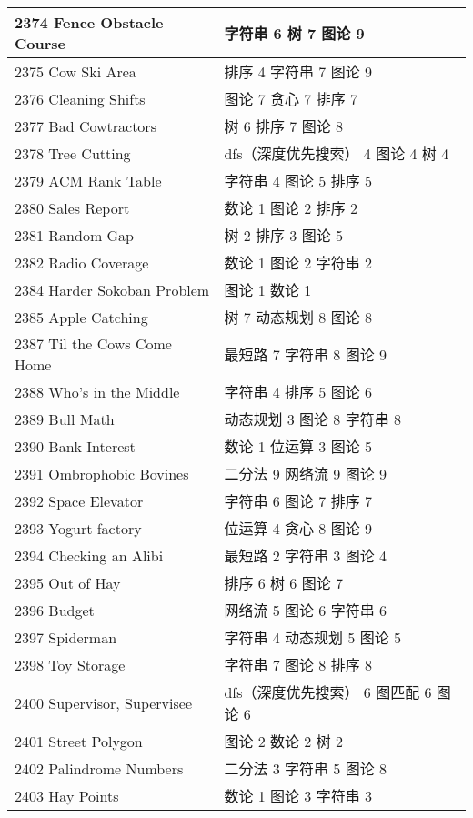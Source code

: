 \begin{longtable}{| p{} | p{} |}
 2374 Fence Obstacle Course  & 字符串 6 树 7 图论 9 \\ \hline
 2375 Cow Ski Area  & 排序 4 字符串 7 图论 9 \\ \hline
 2376 Cleaning Shifts  & 图论 7 贪心 7 排序 7 \\ \hline
 2377 Bad Cowtractors  & 树 6 排序 7 图论 8 \\ \hline
 2378 Tree Cutting  & dfs（深度优先搜索） 4 图论 4 树 4 \\ \hline
 2379 ACM Rank Table  & 字符串 4 图论 5 排序 5 \\ \hline
 2380 Sales Report  & 数论 1 图论 2 排序 2 \\ \hline
 2381 Random Gap  & 树 2 排序 3 图论 5 \\ \hline
 2382 Radio Coverage  & 数论 1 图论 2 字符串 2 \\ \hline
 2384 Harder Sokoban Problem  & 图论 1 数论 1 \\ \hline
 2385 Apple Catching  & 树 7 动态规划 8 图论 8 \\ \hline
 2387 Til the Cows Come Home  & 最短路 7 字符串 8 图论 9 \\ \hline
 2388 Who's in the Middle  & 字符串 4 排序 5 图论 6 \\ \hline
 2389 Bull Math  & 动态规划 3 图论 8 字符串 8 \\ \hline
 2390 Bank Interest  & 数论 1 位运算 3 图论 5 \\ \hline
 2391 Ombrophobic Bovines  & 二分法 9 网络流 9 图论 9 \\ \hline
 2392 Space Elevator  & 字符串 6 图论 7 排序 7 \\ \hline
 2393 Yogurt factory  & 位运算 4 贪心 8 图论 9 \\ \hline
 2394 Checking an Alibi  & 最短路 2 字符串 3 图论 4 \\ \hline
 2395 Out of Hay  & 排序 6 树 6 图论 7 \\ \hline
 2396 Budget  & 网络流 5 图论 6 字符串 6 \\ \hline
 2397 Spiderman  & 字符串 4 动态规划 5 图论 5 \\ \hline
 2398 Toy Storage  & 字符串 7 图论 8 排序 8 \\ \hline
 2400 Supervisor, Supervisee  & dfs（深度优先搜索） 6 图匹配 6 图论 6 \\ \hline
 2401 Street Polygon  & 图论 2 数论 2 树 2 \\ \hline
 2402 Palindrome Numbers  & 二分法 3 字符串 5 图论 8 \\ \hline
 2403 Hay Points  & 数论 1 图论 3 字符串 3 \\ \hline

\end{longtable}
